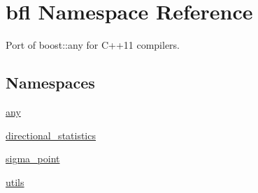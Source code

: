 \hypertarget{namespacebfl}{}\section{bfl Namespace Reference}
\label{namespacebfl}


Port of boost\+::any for C++11 compilers.  


\subsection*{Namespaces}
\begin{DoxyCompactItemize}
\item 
 \mbox{\hyperlink{namespacebfl_1_1any}{any}}
\item 
 \mbox{\hyperlink{namespacebfl_1_1directional__statistics}{directional\+\_\+statistics}}
\item 
 \mbox{\hyperlink{namespacebfl_1_1sigma__point}{sigma\+\_\+point}}
\item 
 \mbox{\hyperlink{namespacebfl_1_1utils}{utils}}
\end{DoxyCompactItemize}
